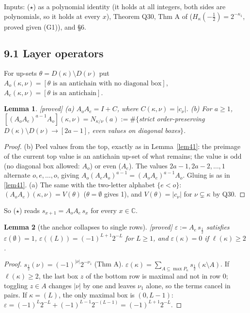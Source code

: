 \documentclass[10pt]{amsart}
\newcommand{\file}[1]{{\footnotesize\texttt{\detokenize{#1}}}}
\newcommand{\grade}[1]{\textsf{[#1]}}
\newcommand{\eo}{\{e<o\}}
\newtheorem{lem}{Lemma}[section]
\theoremstyle{remark}
\begin{document}
Inputs: ($\star$) as a polynomial identity (it holds at all integers, both sides are polynomials, so it holds at every $x$),
Theorem Q30, Thm A of \file{2026-10-23-odd-zero-law.md} ($H_\kappa(-\tfrac12)=2^{-\kappa_1}$, proved given (G1)), and \S6.

\subsection*{9.1 Layer operators}

For up-sets $\theta=D(\kappa)\setminus D(\nu)$ put $A_o(\kappa,\nu)=[\theta\text{ is an antichain with no diagonal box}]$,
$A_e(\kappa,\nu)=[\theta\text{ is an antichain}]$.

\begin{lem}\label{lem91}\grade{proved}
(a) $A_oA_e=I+C$, where $C(\kappa,\nu)=|c_\nu|$. (b) For $a\ge1$, $[(A_oA_e)^{a-1}A_o](\kappa,\nu)=N_{\kappa/\nu}(a):=
\#\{$strict order-preserving $D(\kappa)\setminus D(\nu)\to[2a-1]$, even values on diagonal boxes$\}$.
\end{lem}
\begin{proof}
(b) Peel values from the top, exactly as in Lemma~\ref{lem41}: the preimage of the current top value is an antichain up-set
of what remains; the value is odd (no diagonal box allowed: $A_o$) or even ($A_e$). The values $2a-1,2a-2,\dots,1$ alternate
$o,e,\dots,o$, giving $A_o(A_eA_o)^{a-1}=(A_oA_e)^{a-1}A_o$. Gluing is as in \ref{lem41}. (a) The same with the two-letter
alphabet $\eo$: $(A_oA_e)(\kappa,\nu)=V(\theta)$ ($\theta=\emptyset$ gives 1), and $V(\theta)=|c_\nu|$ for $\nu\subsetneq\kappa$
by Q30.
\end{proof}

So ($\star$) reads $s_{x+1}=A_oA_e\,s_x$ for every $x\in\mathbb C$.

\begin{lem}[the anchor collapses to single rows]\label{lem92}\grade{proved}
$\varepsilon:=A_e\,s_{\frac12}$ satisfies $\varepsilon(\emptyset)=1$, $\varepsilon((L))=(-1)^{L+1}2^{-L}$ for $L\ge1$, and
$\varepsilon(\kappa)=0$ if $\ell(\kappa)\ge2$.
\end{lem}
\begin{proof}
$s_{\frac12}(\nu)=(-1)^{|\nu|}2^{-\nu_1}$ (Thm A). $\varepsilon(\kappa)=\sum_{A\subseteq\max P_\kappa}s_{\frac12}(\kappa\setminus
A)$. If $\ell(\kappa)\ge2$, the last box $z$ of the bottom row is maximal and not in row 0; toggling $z\in A$ changes $|\nu|$
by one and leaves $\nu_1$ alone, so the terms cancel in pairs. If $\kappa=(L)$, the only maximal box is $(0,L-1)$:
$\varepsilon=(-1)^L2^{-L}+(-1)^{L-1}2^{-(L-1)}=(-1)^{L+1}2^{-L}$.
\end{proof}
\end{document}
